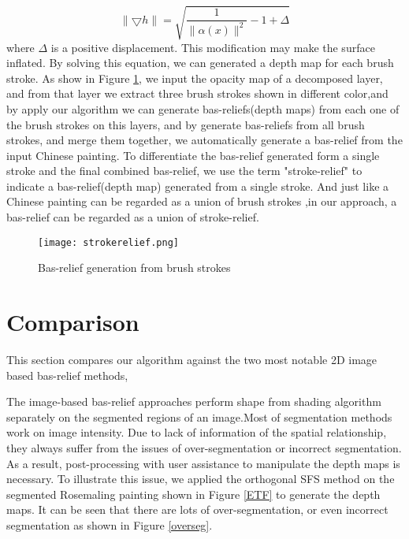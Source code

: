 \begin{equation}
\lVert \bigtriangledown h \rVert = \sqrt{\frac{1}{\lVert \alpha(x) \rVert ^2}-1+ \Delta}
\end{equation}
where $\Delta$ is a positive displacement. This modification may make the surface inflated. By solving this equation, we can generated a depth map for each brush stroke. As show in Figure \ref{strokerelief}, we input the opacity map of a decomposed layer, and from that layer we extract three brush strokes shown in different color,and by apply our algorithm we can generate bas-reliefs(depth maps) from each one of the brush strokes on this layers, and by generate bas-reliefs from all brush strokes, and merge them together, we automatically generate a bas-relief from the input Chinese painting. 
To differentiate the bas-relief generated form a single stroke and the final combined bas-relief, we use the term "stroke-relief" to indicate a bas-relief(depth map) generated from a single stroke. And just like a Chinese painting can be regarded as a union of brush strokes \cite{xu2006animating} ,in our approach, a bas-relief can be regarded as a union of stroke-relief.
\begin{figure}[H]
	\centering
	\texttt{[image: strokerelief.png]}
	\caption{Bas-relief generation from brush strokes}
	\label{strokerelief}
\end{figure}



\section{Comparison}
This section compares our algorithm against the two most notable 2D image based bas-relief methods, 

The image-based bas-relief approaches\cite{zeng2014region} \cite{kolomenkin2011reconstruction} perform shape from shading algorithm separately on the segmented regions of an image.Most of segmentation methods work on image intensity. Due to lack of information of the spatial relationship, they always suffer from the issues of over-segmentation or incorrect segmentation. As a result, post-processing with user assistance to manipulate the depth maps is necessary. To illustrate this issue, we applied the  orthogonal SFS method \cite{prados2004unifying} on the segmented Rosemaling painting shown in Figure \ref{ETF} to generate the depth maps. It can be seen that there are lots of over-segmentation, or even incorrect segmentation as shown in Figure \ref{overseg}.


